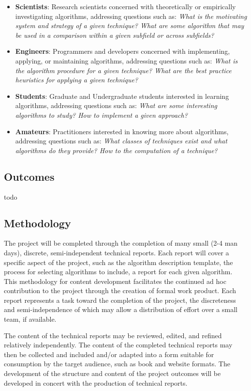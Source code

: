 \documentclass[a4paper, 11pt]{article}
\begin{document}
\begin{itemize}
	\item \textbf{Scientists}: Research scientists concerned with theoretically or empirically investigating algorithms, addressing questions such as: \emph{What is the motivating system and strategy of a given technique? What are some algorithm that may be used in a comparison within a given subfield or across subfields?}
	\item \textbf{Engineers}: Programmers and developers concerned with implementing, applying, or maintaining algorithms, addressing questions such as: \emph{What is the algorithm procedure for a given technique?	What are the best practice heuristics for applying a given technique?}
	\item \textbf{Students}: Graduate and Undergraduate students interested in learning algorithms, addressing questions such as: \emph{What are some interesting algorithms to study? How to implement a given approach?}
	\item \textbf{Amateurs}: Practitioners interested in knowing more about algorithms, addressing questions such as: \emph{What classes of techniques exist and what algorithms do they provide? How to  the computation of a technique?}
\end{itemize}

\subsection{Outcomes}
todo

\subsection{Methodology}
The project will be completed through the completion of many small (2-4 man days), discrete, semi-independent technical reports. Each report will cover a specific aspect of the project, such as the algorithm description template, the process for selecting algorithms to include, a report for each given algorithm. This methodology for content development facilitates the continued ad hoc contribution to the project through the creation of formal work product. Each report represents a task toward the completion of the project, the discreteness and semi-independence of which may allow a distribution of effort over a small team, if available.

The content of the technical reports may be reviewed, edited, and refined relatively independently. The content of the completed technical reports may then be collected and included and/or adapted into a form suitable for consumption by the target audience, such as book and website formats. The development of the structure and content of the project outcomes will be developed in concert with the production of technical reports.
\end{document}
